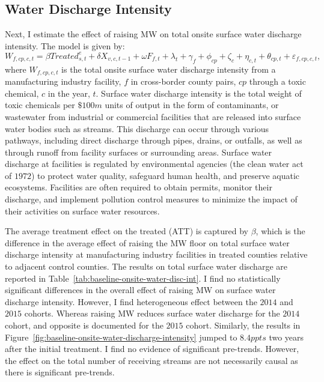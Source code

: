 \documentclass[12pt, english]{article}
\begin{document}
    \subsection{Water Discharge Intensity}\label{subsec:water-discharge-intensity}
    Next, I estimate the effect of raising MW on total onsite surface water discharge intensity. The model is given by:
    \begin{equation}
        W_{f,cp,c,t} = \beta Treated_{s,t}^e + \delta X_{v,c,t-1} + \omega F_{f,t} + \lambda_{t} + \gamma_{f} + \phi_{cp} + \zeta_{c} + \eta_{c,t} + \theta_{cp,t} + \varepsilon_{f,cp,c,t},\label{eq:baseline-onsite-water-discharge-intensity}
    \end{equation}
    where $W_{f,cp,c,t}$ is the total onsite surface water discharge intensity from a manufacturing industry facility, $f$ in cross-border county pairs, $cp$ through a toxic chemical, $c$ in the year, $t$. Surface water discharge intensity is the total weight of toxic chemicals per $\$100m$ units of output in the form of contaminants, or wastewater from industrial or commercial facilities that are released into surface water bodies such as streams. This discharge can occur through various pathways, including direct discharge through pipes, drains, or outfalls, as well as through runoff from facility surfaces or surrounding areas. Surface water discharge at facilities is regulated by environmental agencies (the clean water act of $1972$) to protect water quality, safeguard human health, and preserve aquatic ecosystems. Facilities are often required to obtain permits, monitor their discharge, and implement pollution control measures to minimize the impact of their activities on surface water resources.
    

    The average treatment effect on the treated (ATT) is captured by $\beta$, which is the difference in the average effect of raising the MW floor on total surface water discharge intensity at manufacturing industry facilities in treated counties relative to adjacent control counties. The results on total surface water discharge are reported in Table~\ref{tab:baseline-onsite-water-disc-int}. I find no statistically significant differences in the overall effect of raising MW on surface water discharge intensity. However, I find heterogeneous effect between the  $2014$ and $2015$ cohorts. Whereas raising MW reduces surface water discharge for the $2014$ cohort, and opposite is documented for the $2015$ cohort. Similarly, the results in Figure~\ref{fig:baseline-onsite-water-discharge-intensity} jumped to $8.4ppts$ two years after the initial treatment. I find no evidence of significant pre-trends. However, the effect on the total number of receiving streams are not necessarily causal as there is significant pre-trends.
    
\end{document}
